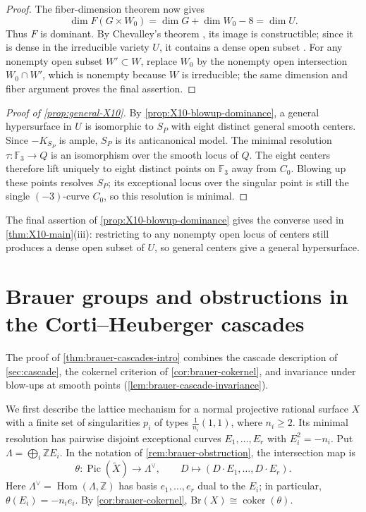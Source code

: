 \documentclass[11pt]{article}
\theoremstyle{plain}
\theoremstyle{definition}
\theoremstyle{remark}
\newcommand{\F}{\mathbb F}
\newcommand{\Z}{\mathbb Z}
\newcommand{\Pic}{\operatorname{Pic}}
\newcommand{\Hom}{\operatorname{Hom}}
\newcommand{\Br}{\mathrm{Br}}
\begin{document}
\begin{proof}
The fiber-dimension theorem now gives
\[
\dim F(G\times W_0)
=\dim G+\dim W_0-8
=\dim U.
\]
Thus \(F\) is dominant. By Chevalley's theorem
\cite[Tag~054K]{StacksProject}, its image is constructible; since it is
dense in the irreducible variety \(U\), it contains a dense open subset
\cite[Tag~005K]{StacksProject}. For any nonempty open subset
\(W'\subset W\), replace \(W_0\) by the nonempty open intersection
\(W_0\cap W'\), which is nonempty because \(W\) is irreducible; the same
dimension and fiber argument proves the final assertion.
\end{proof}

\begin{proof}[Proof of \cref{prop:general-X10}]
By \cref{prop:X10-blowup-dominance}, a general hypersurface in \(U\)
is isomorphic to \(S_P\) with eight distinct general smooth centers.
Since \(-K_{S_P}\) is ample, \(S_P\) is its anticanonical model.
The minimal resolution \(\tau:\F_3\to Q\) is an isomorphism over
the smooth locus of \(Q\). The eight centers therefore lift uniquely
to eight distinct points on \(\F_3\) away from \(C_0\). Blowing up
these points resolves \(S_P\); its exceptional locus over the
singular point is still the single \((-3)\)-curve \(C_0\), so this
resolution is minimal.
\end{proof}

The final assertion of \cref{prop:X10-blowup-dominance} gives the converse
used in \cref{thm:X10-main}(iii): restricting to any nonempty open locus of
centers still produces a dense open subset of \(U\), so general centers give
a general hypersurface.


\section{Brauer groups and obstructions in the Corti--Heuberger cascades}
\label{app:brauer}

The proof of \cref{thm:brauer-cascades-intro} combines the cascade description of
\cref{sec:cascade}, the cokernel criterion of \cref{cor:brauer-cokernel},
and invariance under blow-ups at smooth points (\cref{lem:brauer-cascade-invariance}).

We first describe the lattice mechanism for a normal projective rational surface
\(X\) with a finite set of singularities \(p_i\) of types
\(\frac1{n_i}(1,1)\), where \(n_i\geq2\). Its minimal resolution
has pairwise disjoint exceptional curves \(E_1,\ldots,E_r\) with
\(E_i^2=-n_i\). Put \(\Lambda=\bigoplus_i\Z E_i\). In the notation of
\cref{rem:brauer-obstruction}, the intersection map is
\[
\theta:\Pic(\widetilde X)\longrightarrow\Lambda^\vee,
\qquad
D\longmapsto(D\cdot E_1,\dots,D\cdot E_r).
\]
Here \(\Lambda^\vee=\Hom(\Lambda,\Z)\) has basis \(e_1,\dots,e_r\)
dual to the \(E_i\); in particular, \(\theta(E_i)=-n_i e_i\).
By \cref{cor:brauer-cokernel}, \(\Br(X)\cong\operatorname{coker}(\theta)\).
\end{document}
